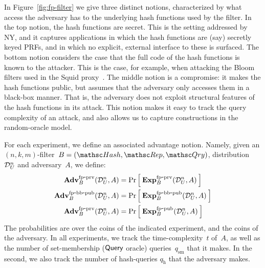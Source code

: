 

In Figure~\ref{fig:fp-filter} we give three distinct notions,
characterized by what access the adversary has to the underlying
hash functions used by the filter.  In the top notion, the hash
functions are secret.  This is the setting addressed by NY, and it
captures applications in which the hash functions are (say) secretly
keyed PRFs, and in which no explicit, external interface to these is
surfaced.
%
The bottom notion considers the case that the full code of the hash functions is known to the attacker.  This is the case, for example, when attacking the Bloom filters used in the Squid proxy~\cite{xxx}.
%
The middle notion is a compromise: it makes the hash functions
public, but assumes that the adversary only accesses them in a
black-box manner.  That is, the adversary does not exploit
structural features of the hash functions in its attack.  This
notion makes it easy to track the query complexity of an attack, and
also allows us to capture constructions in the random-oracle model. 

For each experiment, we define an associated advantage
notion.  Namely, given an $(n,k,m)$-filter~$B=(\Hash,\Rep,\Qry)$,
distribution~$\mathcal{D}_{U}^{n}$ and adversary~$A$, we define:
\begin{align*}
\mathrm{\mathbf{Adv}}^{\mathrm{fp\mbox{-}prv}}_{B}(\mathcal{D}_{U}^{n},A) &= \Pr\left[\: \mathrm{\mathbf{Exp}}^{\mathrm{fp\mbox{-}prv}}_{B}(\mathcal{D}_{U}^{n},A) \:\right] \\
\mathrm{\mathbf{Adv}}^{\mathrm{fp\mbox{-}bb\mbox{-}pub}}_{B}(\mathcal{D}_{U}^{n},A) &= \Pr\left[\: \mathrm{\mathbf{Exp}}^{\mathrm{fp\mbox{-}bb\mbox{-}pub}}_{B}(\mathcal{D}_{U}^{n},A) \:\right] \\
\mathrm{\mathbf{Adv}}^{\mathrm{fp\mbox{-}prv}}_{B}(\mathcal{D}_{U}^{n},A) &= \Pr\left[\: \mathrm{\mathbf{Exp}}^{\mathrm{fp\mbox{-}pub}}_{B}(\mathcal{D}_{U}^{n},A) \:\right]
\end{align*}
The probabilities are over the coins of the indicated experiment,
and the coins of the adversary.   In all experiments, we track the
time-complexity~$t$ of~$A$, as well as the number of set-membership
($\mathsf{Query}$ oracle) queries~$q_{\mathrm{sm}}$ that it makes.   In
the second, we also track the number of hash-queries
$q_{\mathrm{h}}$ that the adversary makes.

